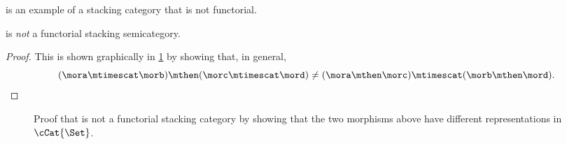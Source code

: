 \Effects is an example of a stacking category that is not functorial.

\begin{lemma}
    \Effects is \emph{not} a functorial stacking semicategory.
\end{lemma}

\begin{proof}
    This is shown graphically in \cref{fig:effects-non-functorial} by showing that, in general,
    \begin{equation*}
        (\mora \mtimescat \morb )
        \mthen (\morc \mtimescat \mord )
        \neq
        (\mora \mthen \morc ) \mtimescat (\morb \mthen \mord ).
    \end{equation*}
\end{proof}

\begin{figure*}[b]
    \centering
    \caption{Proof that \Effects is not a functorial stacking category by showing that
        the two morphisms above have different representations in~$\cCat{\Set}$.}
    \label{fig:effects-non-functorial}
\end{figure*}

